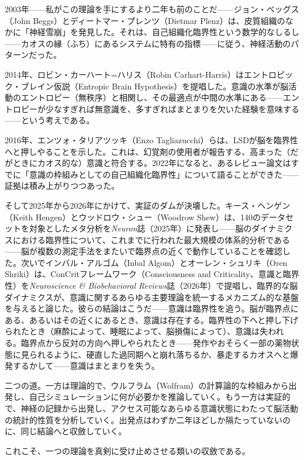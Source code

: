 \documentclass[11pt, twoside, openright]{book}
\begin{document}
2003年------私がこの理論を手にするより二年も前のことだ------ジョン・ベッグス（John Beggs）とディートマー・プレンツ（Dietmar Plenz）は、皮質組織のなかに「神経雪崩」を発見した。それは、自己組織化臨界性という数学的なしるし------カオスの縁（ふち）にあるシステムに特有の指標------に従う、神経活動のパターンだった。

2014年、ロビン・カーハート=ハリス（Robin Carhart-Harris）はエントロピック・ブレイン仮説（Entropic Brain Hypothesis）を提唱した。意識の水準が脳活動のエントロピー（無秩序）と相関し、その最適点が中間の水準にある------エントロピーが少なすぎれば無意識を、多すぎればまとまりを欠いた経験を意味する------という考えである。

2016年、エンツォ・タリアツッキ（Enzo Tagliazucchi）らは、LSDが脳を臨界性へと押しやることを示した。これは、幻覚剤の使用者が報告する、高まった（だがときにカオス的な）意識と符合する。2022年になると、あるレビュー論文はすでに「意識の枠組みとしての自己組織化臨界性」について語ることができた------証拠は積み上がりつつあった。

そして2025年から2026年にかけて、実証のダムが決壊した。キース・ヘンゲン（Keith Hengen）とウッドロウ・シュー（Woodrow Shew）は、140のデータセットを対象としたメタ分析を\textit{Neuron}誌（2025年）に発表し------脳のダイナミクスにおける臨界性について、これまでに行われた最大規模の体系的分析である------脳が複数の測定手法をまたいで臨界点の近くで動作していることを確認した。次いでインバル・アルゴム（Inbal Algom）とオーレン・シュリキ（Oren Shriki）は、ConCritフレームワーク（Consciousness and Criticality、意識と臨界性）を\textit{Neuroscience \& Biobehavioral Reviews}誌（2026年）で提唱し、臨界的な脳ダイナミクスが、意識に関するあらゆる主要理論を統一するメカニズム的な基盤を与えると論じた。彼らの結論はこうだ------意識は臨界性を追う。脳が臨界点にある、あるいはその近くにあるとき、意識は存在する。臨界性の下へと押し下げられたとき（麻酔によって、睡眠によって、脳損傷によって）、意識は失われる。臨界点から反対の方向へ押しやられたとき------発作やおそらく一部の薬物状態に見られるように、硬直した過同期へと崩れ落ちるか、暴走するカオスへと爆発するかして------意識はまとまりを失う。

二つの道。一方は理論的で、ウルフラム（Wolfram）の計算論的な枠組みから出発し、自己シミュレーションに何が必要かを推論していく。もう一方は実証的で、神経の記録から出発し、アクセス可能なあらゆる意識状態にわたって脳活動の統計的性質を分析していく。出発点はわずか二年ほどしか隔たっていないのに、同じ結論へと収斂していく。

これこそ、一つの理論を真剣に受け止めさせる類いの収斂である。
\end{document}
